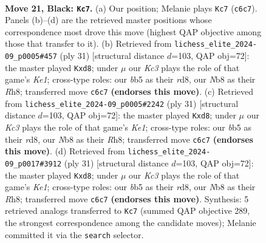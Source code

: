 \documentclass[11pt]{article}
\begin{document}
\clearpage

\begin{figure}[p]\centering
\begin{subfigure}{0.46\textwidth}\centering
\resizebox{\linewidth}{!}{%
\newchessgame
\chessboard[
  setfen={rn2bbr1/1p4np/2k1p1p1/pBP3B1/P3P3/2N5/1P3RPP/3RN1K1 b - - 5 21},
  showmover=false,
  pgfstyle=straightmove, color=movearrow, markmove={c6-c7}
]}
\caption{}
\end{subfigure}\hfill
\begin{subfigure}{0.46\textwidth}\centering
\resizebox{\linewidth}{!}{%
\newchessgame
\chessboard[
  setfen={3Rk2r/2p1bppp/p3b3/1pn1P3/8/5N2/PPB2PPP/R1B3K1 b k - 0 16},
  showmover=false,
  pgfstyle=straightmove, color=movearrow, markmove={e8-d8}
]}
\caption{}
\end{subfigure}
\\[4pt]
\begin{subfigure}{0.46\textwidth}\centering
\resizebox{\linewidth}{!}{%
\newchessgame
\chessboard[
  setfen={3Rk2r/2p1bppp/p3b3/1pn1P3/8/5N2/PPB2PPP/R1B3K1 b k - 0 16},
  showmover=false,
  pgfstyle=straightmove, color=movearrow, markmove={e8-d8}
]}
\caption{}
\end{subfigure}\hfill
\begin{subfigure}{0.46\textwidth}\centering
\resizebox{\linewidth}{!}{%
\newchessgame
\chessboard[
  setfen={3Rk2r/2p1bppp/p3b3/1pn1P3/8/5N2/PPB2PPP/R1B3K1 b k - 0 16},
  showmover=false,
  pgfstyle=straightmove, color=movearrow, markmove={e8-d8}
]}
\caption{}
\end{subfigure}
\caption{\textbf{Move 21, Black: \texttt{Kc7}.} (a) Our position; Melanie plays \texttt{Kc7} (\texttt{c6c7}). Panels (b)--(d) are the retrieved master positions whose correspondence most drove this move (highest QAP objective among those that transfer to it). (b) Retrieved from \texttt{lichess\_elite\_2024-09\_p0005\#457} (ply 31) [structural distance $d$=103, QAP obj=72]: the master played \texttt{Kxd8}; under $\mu$ our \emph{Kc3} plays the role of that game's \emph{Ke1}; cross-type roles: our \emph{b}b5 as their \emph{r}d8, our \emph{N}b8 as their \emph{R}h8; transferred move \texttt{c6c7} \textbf{(endorses this move)}. (c) Retrieved from \texttt{lichess\_elite\_2024-09\_p0005\#2242} (ply 31) [structural distance $d$=103, QAP obj=72]: the master played \texttt{Kxd8}; under $\mu$ our \emph{Kc3} plays the role of that game's \emph{Ke1}; cross-type roles: our \emph{b}b5 as their \emph{r}d8, our \emph{N}b8 as their \emph{R}h8; transferred move \texttt{c6c7} \textbf{(endorses this move)}. (d) Retrieved from \texttt{lichess\_elite\_2024-09\_p0017\#3912} (ply 31) [structural distance $d$=103, QAP obj=72]: the master played \texttt{Kxd8}; under $\mu$ our \emph{Kc3} plays the role of that game's \emph{Ke1}; cross-type roles: our \emph{b}b5 as their \emph{r}d8, our \emph{N}b8 as their \emph{R}h8; transferred move \texttt{c6c7} \textbf{(endorses this move)}. Synthesis: 5 retrieved analogs transferred to \texttt{Kc7} (summed QAP objective 289, the strongest correspondence among the candidate moves); Melanie committed it via the \texttt{search} selector.}
\label{fig:thought-m41}
\end{figure}
\end{document}

